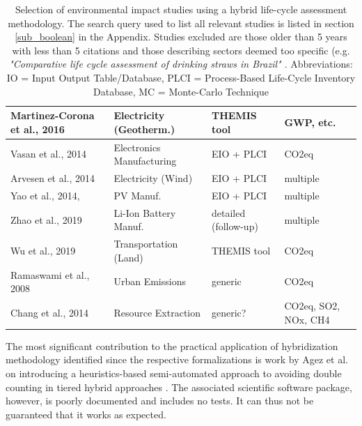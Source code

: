 \documentclass{article}
\begin{document}
\begin{table}[H]
\begin{tabularx}{\textwidth}{| X | X | X | X |}
                \hline
                    Martinez-Corona et al., 2016 \cite{martinez-corona_hybrid_2017} & Electricity (Geotherm.) & THEMIS tool \cite{gibon_methodology_2015} & GWP, etc. \\
                \hline
                    Vasan et al., 2014 \cite{vasan_carbon_2014} & Electronics Manufacturing & EIO + PLCI & CO2eq \\
                \hline
                    Arvesen et al., 2014 \cite{arvesen_life_2014} & Electricity (Wind) & EIO + PLCI & multiple \\
                \hline
                    Yao et al., 2014, \cite{yao_hybrid_2014} & PV Manuf. & EIO + PLCI & multiple \\
                \hline
                    Zhao et al., 2019 \cite{zhao_comparative_2019} & Li-Ion Battery Manuf. & detailed (follow-up) & multiple \\
                \hline
                    Wu et al., 2019 \cite{wu_assessing_2019} & Transportation (Land) & THEMIS tool \cite{gibon_methodology_2015} & CO2eq \\
                \hline
                    Ramaswami et al., 2008 \cite{ramaswami_demand-centered_2008} & Urban Emissions & generic & CO2eq \\
                \hline
                    Chang et al., 2014 \cite{chang_shale--well_2014} & Resource Extraction & generic? & CO2eq, SO2, NOx, CH4 \\
                \hline
            \end{tabularx}
            \caption{Selection of environmental impact studies using a hybrid life-cycle assessment methodology. The search query used to list all relevant studies is listed in section \ref{sub_boolean} in the Appendix. Studies excluded are those older than 5 years with less than 5 citations and those describing sectors deemed too specific (e.g. \textit{"Comparative life cycle assessment of drinking straws in Brazil" \cite{zanghelini_comparative_2020}}. Abbreviations: IO = Input Output Table/Database, PLCI = Process-Based Life-Cycle Inventory Database, MC = Monte-Carlo Technique}
            \label{tab_studies}
        \end{table}
        
        The most significant contribution to the practical application of hybridization methodology identified since the respective formalizations is work by Agez et al. on introducing a heuristics-based semi-automated approach to avoiding double counting in tiered hybrid approaches \cite{agez_lifting_2019}\cite{agez_hybridization_2020}\cite{agez_correcting_2022}. The associated scientific software package, however, is poorly documented and includes no tests. It can thus not be guaranteed that it works as expected.
        
\end{document}
